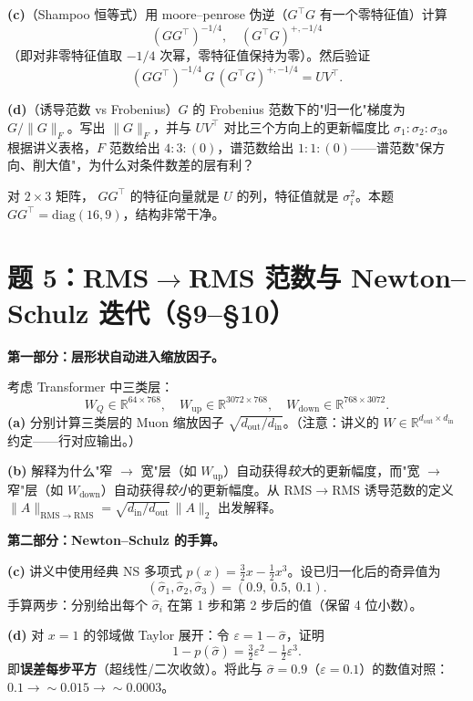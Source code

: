 \documentclass[12pt,a4paper]{article}
\begin{document}
\textbf{(c)}（Shampoo 恒等式）用 moore–penrose 伪逆（$G^\top G$ 有一个零特征值）计算
\[
(GG^\top)^{-1/4},\quad (G^\top G)^{+,-1/4}
\]
（即对非零特征值取 $-1/4$ 次幂，零特征值保持为零）。然后验证
\[
(GG^\top)^{-1/4}\, G\, (G^\top G)^{+,-1/4} = U V^\top.
\]

\textbf{(d)}（诱导范数 vs Frobenius）$G$ 的 Frobenius 范数下的"归一化"梯度为 $G/\|G\|_F$。写出 $\|G\|_F$，并与 $UV^\top$ 对比三个方向上的更新幅度比 $\sigma_1 : \sigma_2 : \sigma_3$。根据讲义表格，$F$ 范数给出 $4:3:(0)$，谱范数给出 $1:1:(0)$——谱范数"保方向、削大值"，为什么对条件数差的层有利？

\begin{hintbox}
对 $2\times 3$ 矩阵， $GG^\top$ 的特征向量就是 $U$ 的列，特征值就是 $\sigma_i^2$。本题 $GG^\top = \mathrm{diag}(16, 9)$，结构非常干净。
\end{hintbox}

\section*{题 5：RMS$\to$RMS 范数与 Newton–Schulz 迭代（§9–§10）}

\textbf{第一部分：层形状自动进入缩放因子。}

考虑 Transformer 中三类层：
\[
W_Q \in \mathbb{R}^{64 \times 768},\quad W_{\mathrm{up}} \in \mathbb{R}^{3072 \times 768},\quad W_{\mathrm{down}} \in \mathbb{R}^{768 \times 3072}.
\]
\textbf{(a)} 分别计算三类层的 Muon 缩放因子 $\sqrt{d_{\mathrm{out}}/d_{\mathrm{in}}}$。（注意：讲义的 $W \in \mathbb{R}^{d_{\mathrm{out}} \times d_{\mathrm{in}}}$ 约定——行对应输出。）

\textbf{(b)} 解释为什么"窄 $\to$ 宽"层（如 $W_{\mathrm{up}}$）自动获得\emph{较大}的更新幅度，而"宽 $\to$ 窄"层（如 $W_{\mathrm{down}}$）自动获得\emph{较小}的更新幅度。从 RMS$\to$RMS 诱导范数的定义 $\|A\|_{\mathrm{RMS}\to\mathrm{RMS}} = \sqrt{d_{\mathrm{in}}/d_{\mathrm{out}}}\, \|A\|_2$ 出发解释。

\textbf{第二部分：Newton–Schulz 的手算。}

\textbf{(c)} 讲义中使用经典 NS 多项式 $p(x) = \tfrac{3}{2} x - \tfrac{1}{2} x^3$。设已归一化后的奇异值为
\[
(\hat\sigma_1, \hat\sigma_2, \hat\sigma_3) = (0.9,\ 0.5,\ 0.1).
\]
手算两步：分别给出每个 $\hat\sigma_i$ 在第 1 步和第 2 步后的值（保留 4 位小数）。

\textbf{(d)} 对 $x = 1$ 的邻域做 Taylor 展开：令 $\varepsilon = 1 - \hat\sigma$，证明
\[
1 - p(\hat\sigma) = \tfrac{3}{2}\varepsilon^2 - \tfrac{1}{2}\varepsilon^3.
\]
即\textbf{误差每步平方}（超线性/二次收敛）。将此与 $\hat\sigma = 0.9$（$\varepsilon = 0.1$）的数值对照：$0.1 \to \sim 0.015 \to \sim 0.0003$。
\end{document}
